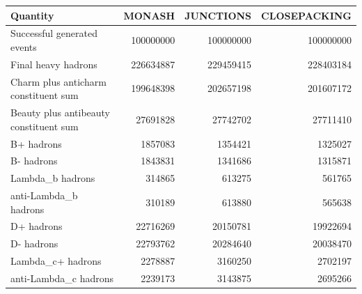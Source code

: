 \begin{tabular}{lrrr}
\hline
Quantity & MONASH & JUNCTIONS & CLOSEPACKING \\
\hline
Successful generated events & 100000000 & 100000000 & 100000000 \\
Final heavy hadrons & 226634887 & 229459415 & 228403184 \\
Charm plus anticharm constituent sum & 199648398 & 202657198 & 201607172 \\
Beauty plus antibeauty constituent sum & 27691828 & 27742702 & 27711410 \\
B+ hadrons & 1857083 & 1354421 & 1325027 \\
B- hadrons & 1843831 & 1341686 & 1315871 \\
Lambda\_b hadrons & 314865 & 613275 & 561765 \\
anti-Lambda\_b hadrons & 310189 & 613880 & 565638 \\
D+ hadrons & 22716269 & 20150781 & 19922694 \\
D- hadrons & 22793762 & 20284640 & 20038470 \\
Lambda\_c+ hadrons & 2278887 & 3160250 & 2702197 \\
anti-Lambda\_c hadrons & 2239173 & 3143875 & 2695266 \\
\hline
\end{tabular}
